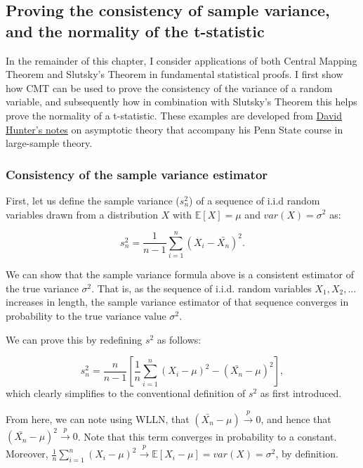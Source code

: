 \documentclass[
]{book}
\begin{document}
\hypertarget{proving-the-consistency-of-sample-variance-and-the-normality-of-the-t-statistic}{%
\subsection{Proving the consistency of sample variance, and the normality of the t-statistic}\label{proving-the-consistency-of-sample-variance-and-the-normality-of-the-t-statistic}}

In the remainder of this chapter, I consider applications of both Central Mapping Theorem and Slutsky's Theorem in fundamental statistical proofs. I first show how CMT can be used to prove the consistency of the variance of a random variable, and subsequently how in combination with Slutsky's Theorem this helps prove the normality of a t-statistic. These examples are developed from \href{http://personal.psu.edu/drh20/asymp/lectures/asymp.pdf}{David Hunter's notes} on asymptotic theory that accompany his Penn State course in large-sample theory.

\hypertarget{consistency-of-the-sample-variance-estimator}{%
\subsubsection{Consistency of the sample variance estimator}\label{consistency-of-the-sample-variance-estimator}}

First, let us define the sample variance (\(s^2_n\)) of a sequence of i.i.d random variables drawn from a distribution \(X\) with \(\mathbb{E}[X] = \mu\) and \(var(X) = \sigma^2\) as:

\[ s^2_n = \frac{1}{n-1}\sum_{i=1}^n (X_i - \bar{X_n})^2.\]

We can show that the sample variance formula above is a consistent estimator of the true variance \(\sigma^2\). That is, as the sequence of i.i.d. random variables \(X_1, X_2,...\) increases in length, the sample variance estimator of that sequence converges in probability to the true variance value \(\sigma^2\).

We can prove this by redefining \(s^2\) as follows:

\[ s^2_n = \frac{n}{n-1} \left[\frac{1}{n}\sum_{i=1}^n(X_i - \mu)^2 - (\bar{X_n}-\mu)^2 \right], \]
which clearly simplifies to the conventional definition of \(s^2\) as first introduced.

From here, we can note using WLLN, that \((\bar{X_n} - \mu) \xrightarrow{p} 0\), and hence that \((\bar{X_n}-\mu)^2 \xrightarrow{p} 0\). Note that this term converges in probability to a constant. Moreover, \(\frac{1}{n}\sum_{i=1}^n(X_i - \mu)^2 \xrightarrow{p} \mathbb{E}[X_i - \mu] = var(X) = \sigma^2\), by definition.
\end{document}
